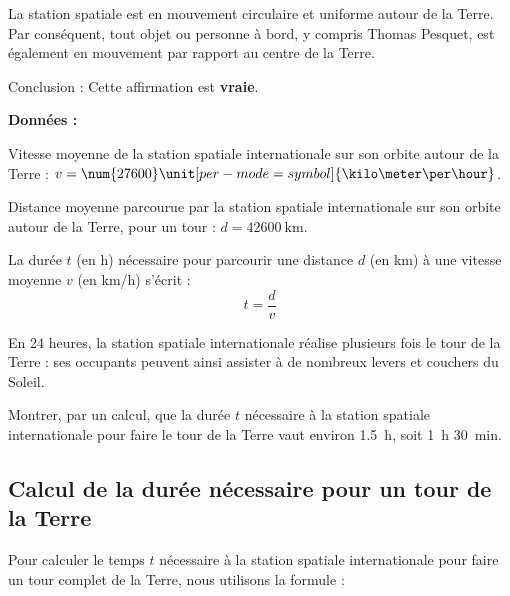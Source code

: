 \documentclass[answers]{exam}
\begin{document}
\begin{questions}
\begin{solution}
\begin{compactitem}
    \begin{compactitem}
        \item La station spatiale est en mouvement circulaire et uniforme autour de la Terre. Par conséquent, tout objet ou personne à bord, y compris Thomas Pesquet, est également en mouvement par rapport au centre de la Terre.
        \item Conclusion : Cette affirmation est \textbf{vraie}.
    \end{compactitem}
\end{compactitem}

\end{solution}

\question[4] \textbf{Données :}
  
  \begin{compactitem}
  \item Vitesse moyenne de la station spatiale internationale sur son orbite autour de la Terre : $v = \num{27600} \unit[per-mode = symbol]{\kilo\meter\per\hour}$.
  \item Distance moyenne parcourue par la station spatiale internationale sur son orbite autour de la Terre, pour un tour : $d = \SI{42600}{\kilo\meter}$.
  \item La durée $t$ (en h) nécessaire pour parcourir une distance $d$ (en km) à une vitesse moyenne $v$ (en \unit[per-mode = symbol]{\kilo\meter\per\hour}) s'écrit :
  \[
  t = \frac{d}{v}
  \]
  \end{compactitem}
  
  En 24 heures, la station spatiale internationale réalise plusieurs fois le tour de la Terre : ses occupants peuvent ainsi assister à de nombreux levers et couchers du Soleil.
  
  Montrer, par un calcul, que la durée $t$ nécessaire à la station spatiale internationale pour faire le tour de la Terre vaut environ \SI{1.5}{\hour}, soit \SI{1}{\hour} \SI{30}{\minute}.
  
  

\begin{solution}

\subsection*{Calcul de la durée nécessaire pour un tour de la Terre}

Pour calculer le temps $t$ nécessaire à la station spatiale internationale pour faire un tour complet de la Terre, nous utilisons la formule :


\end{solution}
\end{questions}
\end{document}
